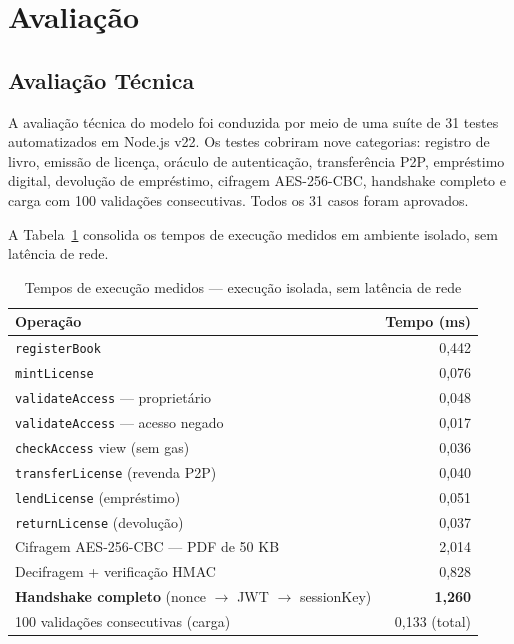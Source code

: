 \documentclass[12pt]{article}
\begin{document}
\section{Avaliação}

\subsection{Avaliação Técnica}

A avaliação técnica do modelo foi conduzida por meio de uma suíte de 31 testes automatizados em Node.js v22. Os testes cobriram nove categorias: registro de livro, emissão de licença, oráculo de autenticação, transferência P2P, empréstimo digital, devolução de empréstimo, cifragem AES-256-CBC, handshake completo e carga com 100 validações consecutivas. Todos os 31 casos foram aprovados.

A Tabela~\ref{tab:tempos} consolida os tempos de execução medidos em ambiente isolado, sem latência de rede.

\begin{table}[H]
\centering
\caption{Tempos de execução medidos --- execução isolada, sem latência de rede}
\label{tab:tempos}
\begin{tabular}{|l|r|}
\hline
\textbf{Operação}                                      & \textbf{Tempo (ms)} \\
\hline
\texttt{registerBook}                                  & 0,442 \\
\hline
\texttt{mintLicense}                                   & 0,076 \\
\hline
\texttt{validateAccess} --- proprietário               & 0,048 \\
\hline
\texttt{validateAccess} --- acesso negado              & 0,017 \\
\hline
\texttt{checkAccess} view (sem gas)                    & 0,036 \\
\hline
\texttt{transferLicense} (revenda P2P)                 & 0,040 \\
\hline
\texttt{lendLicense} (empréstimo)                      & 0,051 \\
\hline
\texttt{returnLicense} (devolução)                     & 0,037 \\
\hline
Cifragem AES-256-CBC --- PDF de 50 KB                  & 2,014 \\
\hline
Decifragem + verificação HMAC                          & 0,828 \\
\hline
\textbf{Handshake completo} (nonce $\to$ JWT $\to$ sessionKey) & \textbf{1,260} \\
\hline
100 validações consecutivas (carga)                    & 0,133 (total) \\
\hline
\end{tabular}
\end{table}
\end{document}
